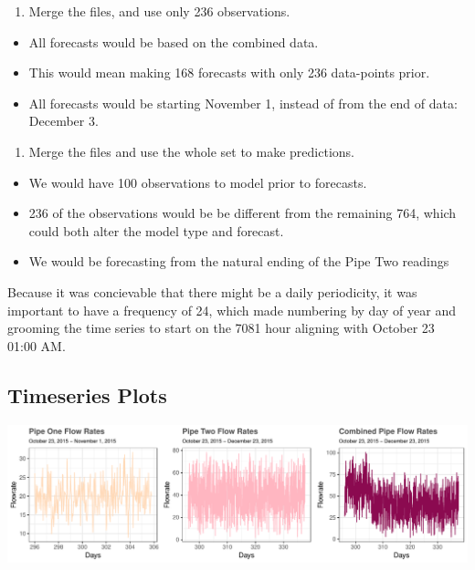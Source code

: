 \documentclass[openany]{book}
\providecommand{\tightlist}{%
  \setlength{\itemsep}{0pt}\setlength{\parskip}{0pt}}
\begin{document}
\begin{enumerate}
\def\labelenumi{\arabic{enumi}.}
\tightlist
\item
  Merge the files, and use only 236 observations.
\end{enumerate}

\begin{itemize}
\tightlist
\item
  All forecasts would be based on the combined data.
\item
  This would mean making 168 forecasts with only 236 data-points prior.
\item
  All forecasts would be starting November 1, instead of from the end of
  data: December 3.\\
\end{itemize}

\begin{enumerate}
\def\labelenumi{\arabic{enumi}.}
\setcounter{enumi}{1}
\tightlist
\item
  Merge the files and use the whole set to make predictions.\\
\end{enumerate}

\begin{itemize}
\tightlist
\item
  We would have 100 observations to model prior to forecasts.
\item
  236 of the observations would be be different from the remaining 764,
  which could both alter the model type and forecast.
\item
  We would be forecasting from the natural ending of the Pipe Two
  readings
\end{itemize}

Because it was concievable that there might be a daily periodicity, it
was important to have a frequency of 24, which made numbering by day of
year and grooming the time series to start on the 7081 hour aligning
with October 23 01:00 AM.

\hypertarget{timeseries-plots-1}{%
\subsection{Timeseries Plots}\label{timeseries-plots-1}}

\includegraphics{Group2_Project1_Fall2019_files/figure-latex/unnamed-chunk-17-1.pdf}
\end{document}
